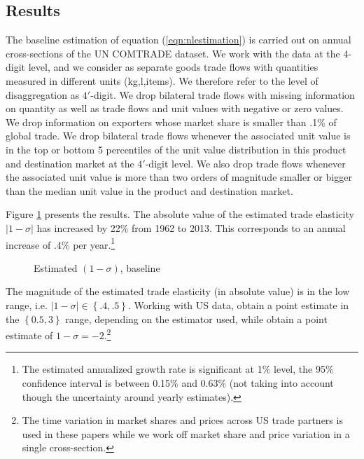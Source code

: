 \documentclass[12pt,twoside,a4paper,notitlepage]{article}
\begin{document}
\subsection{Results}\label{subsec:baseline}

The baseline estimation of equation (\ref{eqn:nlestimation}) is carried out on annual cross-sections of the UN COMTRADE dataset.
We work with the data at the 4-digit level, and we consider as separate goods trade flows with quantities measured in different units (kg,l,items). 
We therefore refer to the level of disaggregation as $4'$-digit.
We drop bilateral trade flows with missing information on quantity as well as trade flows and unit values with negative or zero values.
We drop information on exporters whose market share is smaller than .1\% of global trade. 
We drop bilateral trade flows whenever the associated unit value is in the top or bottom 5 percentiles of the unit value distribution in this product and destination market at the $4'$-digit level.
We also drop trade flows whenever the associated unit value is more than two orders of magnitude smaller or bigger than the median unit value in the product and destination market.

Figure \ref{fig:baseline} presents the results.
The absolute value of the estimated trade elasticity $|1-\sigma|$ has increased by 22\% from 1962 to 2013.
This corresponds to an annual increase of .4\% per year.\footnote{The estimated annualized growth rate is significant at 1\% level, the 95\% confidence interval is between 0.15\% and 0.63\% (not taking into account though the uncertainty around yearly estimates).}

\begin{figure}[H]
\caption{Estimated $(1-\sigma)$, baseline\label{fig:baseline}}
\begin{center}
\setlength{\fboxrule}{1pt} %
\setlength{\fboxsep}{.1in} %
\end{center}
\end{figure}

The magnitude of the estimated trade elasticity (in absolute value) is in the low range, i.e. $|1-\sigma|\in\left\{.4,.5\right\}$. Working with US data, \cite{Feenstra2018} obtain a point estimate in the $\left\{0.5,3\right\}$ range, depending on the estimator used, while \cite{Imbs2015} obtain a point estimate of $1-\sigma=-2$.\footnote{The time variation in market shares and prices across US trade partners is used in these papers while we work off market share and price variation in a single cross-section.}
\end{document}
